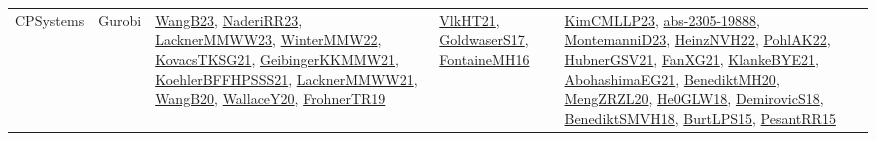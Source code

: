 {\begin{longtable}{lp{3cm}>{\raggedright}p{6cm}>{\raggedright}p{6cm}p{8cm}}
CPSystems & Gurobi & \href{papers/WangB23.pdf}{WangB23}\cite{WangB23}, \href{articles/NaderiRR23.pdf}{NaderiRR23}\cite{NaderiRR23}, \href{articles/LacknerMMWW23.pdf}{LacknerMMWW23}\cite{LacknerMMWW23}, \href{papers/WinterMMW22.pdf}{WinterMMW22}\cite{WinterMMW22}, \href{papers/KovacsTKSG21.pdf}{KovacsTKSG21}\cite{KovacsTKSG21}, \href{papers/GeibingerKKMMW21.pdf}{GeibingerKKMMW21}\cite{GeibingerKKMMW21}, \href{articles/KoehlerBFFHPSSS21.pdf}{KoehlerBFFHPSSS21}\cite{KoehlerBFFHPSSS21}, \href{papers/LacknerMMWW21.pdf}{LacknerMMWW21}\cite{LacknerMMWW21}, \href{papers/WangB20.pdf}{WangB20}\cite{WangB20}, \href{articles/WallaceY20.pdf}{WallaceY20}\cite{WallaceY20}, \href{papers/FrohnerTR19.pdf}{FrohnerTR19}\cite{FrohnerTR19} & \href{articles/VlkHT21.pdf}{VlkHT21}\cite{VlkHT21}, \href{papers/GoldwaserS17.pdf}{GoldwaserS17}\cite{GoldwaserS17}, \href{papers/FontaineMH16.pdf}{FontaineMH16}\cite{FontaineMH16} & \href{papers/KimCMLLP23.pdf}{KimCMLLP23}\cite{KimCMLLP23}, \href{articles/abs-2305-19888.pdf}{abs-2305-19888}\cite{abs-2305-19888}, \href{articles/MontemanniD23.pdf}{MontemanniD23}\cite{MontemanniD23}, \href{articles/HeinzNVH22.pdf}{HeinzNVH22}\cite{HeinzNVH22}, \href{articles/PohlAK22.pdf}{PohlAK22}\cite{PohlAK22}, \href{articles/HubnerGSV21.pdf}{HubnerGSV21}\cite{HubnerGSV21}, \href{articles/FanXG21.pdf}{FanXG21}\cite{FanXG21}, \href{papers/KlankeBYE21.pdf}{KlankeBYE21}\cite{KlankeBYE21}, \href{articles/AbohashimaEG21.pdf}{AbohashimaEG21}\cite{AbohashimaEG21}, \href{articles/BenediktMH20.pdf}{BenediktMH20}\cite{BenediktMH20}, \href{articles/MengZRZL20.pdf}{MengZRZL20}\cite{MengZRZL20}, \href{papers/He0GLW18.pdf}{He0GLW18}\cite{He0GLW18}, \href{papers/DemirovicS18.pdf}{DemirovicS18}\cite{DemirovicS18}, \href{papers/BenediktSMVH18.pdf}{BenediktSMVH18}\cite{BenediktSMVH18}, \href{papers/BurtLPS15.pdf}{BurtLPS15}\cite{BurtLPS15}, \href{papers/PesantRR15.pdf}{PesantRR15}\cite{PesantRR15}\\

\end{longtable}}
